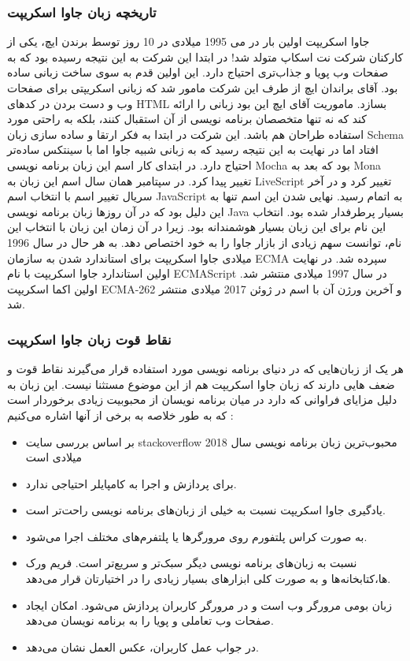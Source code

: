 \subsubsection{تاریخچه زبان جاوا اسکریپت}
جاوا اسکریپت اولین بار در می ‌1995 میلادی در 10 روز توسط برندن ایچ، یکی از کارکنان شرکت
نت اسکاپ
 متولد شد! در ابتدا این شرکت به این نتیجه رسیده بود که به صفحات وب پویا و جذاب‌تری احتیاج دارد. این اولین قدم به سوی ساخت زبانی ساده بود. آقای براندان ایچ از طرف این شرکت مامور شد که زبانی اسکریپتی برای صفحات وب و دست بردن در کدهای HTML بسازد. ماموریت آقای ایچ این بود زبانی را ارائه کند که نه تنها متخصصان برنامه نویسی از آن استقبال کنند، بلکه به راحتی مورد استفاده طراحان هم باشد.
این شرکت در ابتدا به فکر ارتقا و ساده سازی زبان Schema افتاد اما در نهایت به این نتیجه رسید که به زبانی شبیه جاوا اما با سینتکس ساده‌تر احتیاج دارد. در ابتدای کار اسم این زبان برنامه نویسی Mocha بود که بعد به Mona تغییر پیدا کرد. در سپتامبر همان سال اسم این زبان به LiveScript تغییر کرد و در آخر سریال تغییر اسم با انتخاب اسم JavaScript به اتمام  رسید.
نهایی شدن این اسم تنها به این دلیل بود که در آن روز‌ها زبان برنامه نویسی Java بسیار پرطرفدار شده بود. انتخاب این نام برای این زبان بسیار هوشمندانه بود. زیرا در آن زمان  این زبان با انتخاب این نام، توانست سهم زیادی از بازار جاوا را به خود اختصاص دهد. به هر حال در سال 1996 میلادی جاوا اسکریپت برای استاندارد شدن به سازمان ECMA سپرده شد. در نهایت اولین استاندارد جاوا اسکریپت با نام ECMAScript در سال 1997 میلادی منتشر شد. اولین اکما اسکریپت ECMA-262 و آخرین ورژن آن با اسم
در ژوئن 2017 میلادی منتشر شد.

\subsubsection{نقاط قوت زبان جاوا اسکریپت}
هر یک از زبان‌هایی که در دنیای برنامه نویسی مورد استفاده قرار می‌گیرند نقاط قوت و ضعف هایی دارند که زبان جاوا اسکریپت هم از این موضوع مستثنا نیست. این زبان به دلیل مزایای فراوانی که دارد در میان برنامه نویسان از محبوبیت زیادی برخوردار است که به طور خلاصه به برخی از آنها اشاره می‌کنیم :
\begin{itemize}
	\item
بر اساس بررسی سایت stackoverflow محبوب‌ترین زبان برنامه نویسی سال 2018 میلادی است
	\item
برای پردازش و اجرا به کامپایلر احتیاجی ندارد.
	\item
یادگیری جاوا اسکریپت نسبت به خیلی از زبان‌های برنامه نویسی راحت‌تر است.
	\item
به صورت کراس پلتفورم روی مرورگر‌ها یا پلتفرم‌های مختلف اجرا می‌شود.
	\item
نسبت به زبان‌های برنامه نویسی دیگر سبک‌تر و سریع‌تر است.
فریم ورک ها،کتابخانه‌ها و به صورت کلی ابزارهای بسیار زیادی را در اختیارتان قرار می‌دهد.
	\item
زبان بومی مرورگر وب است و در مرورگر کاربران پردازش می‌شود.
امکان ایجاد صفحات وب تعاملی و پویا را به برنامه نویسان می‌دهد.
	\item
در جواب عمل کاربران، عکس العمل نشان می‌دهد.

\end{itemize}

